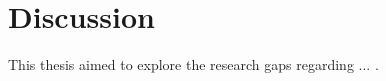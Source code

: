 \onehalfspacing
\section{Discussion}\label{sec:discussion}
\vspace{-0.5cm}
\justifying
This thesis aimed to explore the research gaps regarding ... .



